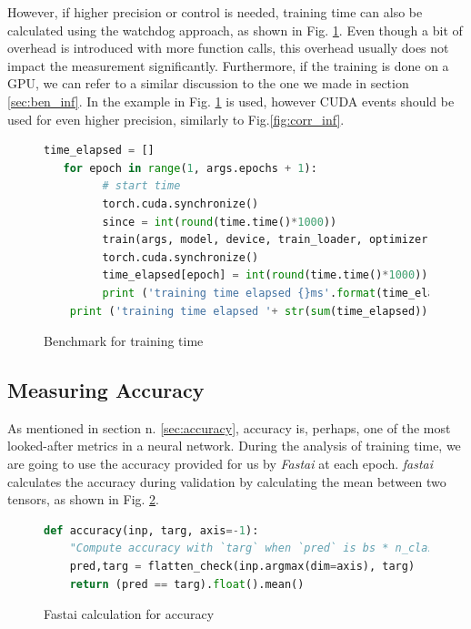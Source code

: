 However, if higher precision or control is needed, training time can also be calculated using the watchdog approach, as shown in Fig. \ref{fig:ben_tra}. Even though a bit of overhead is introduced with more function calls, this overhead usually does not impact the measurement significantly. Furthermore, if the training is done on a GPU, we can refer to a similar discussion to the one we made in section \ref{sec:ben_inf}. In the example in Fig. \ref{fig:ben_tra} is used, however CUDA events should be used for even higher precision, similarly to Fig.\ref{fig:corr_inf}. 
\begin{figure}[h]
\begin{lstlisting}[language=python]
   time_elapsed = []
   for epoch in range(1, args.epochs + 1):
         # start time
         torch.cuda.synchronize()
         since = int(round(time.time()*1000))
         train(args, model, device, train_loader, optimizer, epoch)
         torch.cuda.synchronize()
         time_elapsed[epoch] = int(round(time.time()*1000)) - since
         print ('training time elapsed {}ms'.format(time_elapsed[epoch]))
    print ('training time elapsed '+ str(sum(time_elapsed)) + 'ms')
\end{lstlisting}
\caption{Benchmark for training time}
\label{fig:ben_tra}
\end{figure}




\subsection{Measuring Accuracy}
As mentioned in section n. \ref{sec:accuracy}, accuracy is, perhaps, one of the most looked-after metrics in a neural network. 
During the analysis of training time, we are going to use the accuracy provided for us by \textit{Fastai} at each epoch. \textit{fastai} calculates the accuracy during validation by calculating the mean between two tensors, as shown in Fig. \ref{fig:fast_acc}. \cite{fastaidocs}
\begin{figure}[h]
\begin{lstlisting}[language=python]
def accuracy(inp, targ, axis=-1):
    "Compute accuracy with `targ` when `pred` is bs * n_classes"
    pred,targ = flatten_check(inp.argmax(dim=axis), targ)
    return (pred == targ).float().mean()
\end{lstlisting}
\caption{Fastai calculation for accuracy \cite{fastaidocs}}
\label{fig:fast_acc}
\end{figure}














